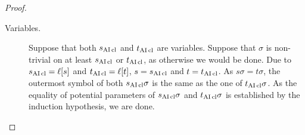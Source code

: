 \documentclass[,%
	paper=a4,%
	DIV12, %
	twoside=false,%
	liststotoc,
	bibtotoc,
	draft=false,%
	numbers=noendperiod
]{scrartcl}
\begin{document}
\begin{proof}
\begin{description}
		\item[Variables.]
			Suppose that both $s_{\operatorname{AI}\mathrm{cl}}$ and $t_{\operatorname{AI}\mathrm{cl}}$ are variables. 
			Suppose that $\sigma$ is non-trivial on at least $s_{\operatorname{AI}\mathrm{cl}}$ or $t_{\operatorname{AI}\mathrm{cl}}$, as otherwise we would be done.
			Due to $s_{\operatorname{AI}\mathrm{cl}} = \ell[s]$ and $t_{\operatorname{AI}\mathrm{cl}} = \ell[t]$, $s = s_{\operatorname{AI}\mathrm{cl}}$ and $t=t_{\operatorname{AI}\mathrm{cl}}$.
			As $s\sigma=t\sigma$,  the outermost symbol of both $s_{\operatorname{AI}\mathrm{cl}}\sigma$ is the same as the one of $t_{\operatorname{AI}\mathrm{cl}}\sigma$. As the equality of potential parameters of $s_{\operatorname{AI}\mathrm{cl}}\sigma$ and $t_{\operatorname{AI}\mathrm{cl}}\sigma$ is established by the induction hypothesis, we are done.
			\qedhere
	\end{description}
\end{proof}

			\newcommand{\clauseOnePrime}{\AIclause(C_1)^*}
			\newcommand{\clauseTwoPrime}{\AIclause(C_2)^*}
\end{document}
